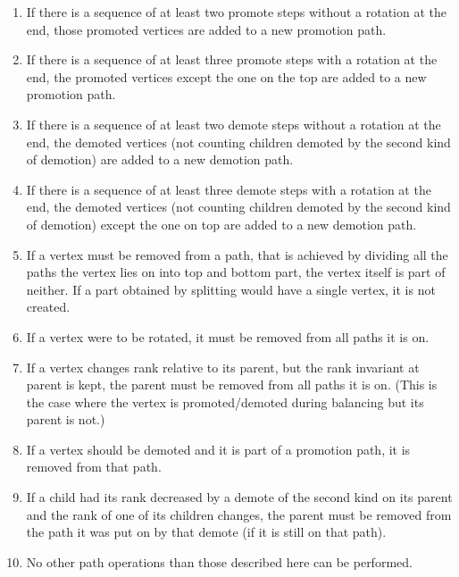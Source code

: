 \begin{enumerate}

\item If there is a sequence of at least two promote steps without a rotation at the end, those promoted vertices are added to a new promotion path. 

\item If there is a sequence of at least three promote steps with a rotation at the end, the promoted vertices except the one on the top are added to a new promotion path.

\item If there is a sequence of at least two demote steps without a rotation at the end, the demoted vertices (not counting children demoted by the second kind of demotion) are added to a new demotion path.

\item If there is a sequence of at least three demote steps with a rotation at the end, the demoted vertices (not counting children demoted by the second kind of demotion) except the one on top are added to a new demotion path.

\item If a vertex must be removed from a path, that is achieved by dividing all the paths the vertex lies on into top and bottom part, the vertex itself is part of neither. If a part obtained by splitting would have a single vertex, it is not created.

\item If a vertex were to be rotated, it must be removed from all paths it is on.

\item If a vertex changes rank relative to its parent, but the rank invariant at parent is kept, the parent must be removed from all paths it is on. (This is the case where the vertex is promoted/demoted during balancing but its parent is not.)

\item If a vertex should be demoted and it is part of a promotion path, it is removed from that path.

\item If a child had its rank decreased by a demote of the second kind on its parent and the rank of one of its children changes, the parent must be removed from the path it was put on by that demote (if it is still on that path).

\item No other path operations than those described here can be performed.

\end{enumerate}

